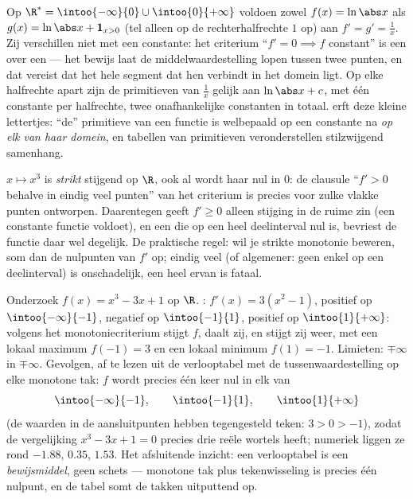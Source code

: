 \begin{example}\label{ex:b1:derivative:intervalmatters}
Op $\R^* = \intoo{-\infty}{0} \cup \intoo{0}{+\infty}$ voldoen
zowel $f(x) = \ln\abs x$ als $g(x) = \ln\abs x + \mathbf{1}_{x>0}$
(tel alleen op de rechterhalfrechte $1$ op) aan $f' = g' =
\frac1x$. Zij verschillen niet met een constante: het criterium
``$f' = 0 \implies f$ constant'' is een  over een
\emph{} --- het bewijs laat de middelwaardestelling lopen
tussen twee punten, en dat vereist dat het hele segment dat hen
verbindt in het domein ligt. Op elke halfrechte apart zijn de
primitieven van $\frac1x$ gelijk aan $\ln\abs x + c$, met één
constante per halfrechte, twee onafhankelijke constanten in
totaal.  erft deze kleine lettertjes:
``de'' primitieve van een functie is welbepaald op een constante
na \emph{op elk  van haar domein}, en tabellen van
primitieven veronderstellen stilzwijgend samenhang.
\end{example}

\begin{example}\label{ex:b1:derivative:strictness}
$x \mapsto x^3$ is \emph{strikt} stijgend op $\R$, ook al wordt
haar  nul in $0$: de clausule ``$f' > 0$ behalve in
eindig veel punten'' van het criterium is precies voor zulke
vlakke punten ontworpen. Daarentegen geeft $f' \geq 0$ alleen
stijging in de ruime zin (een constante functie voldoet), en een
 die op een heel deelinterval nul is, bevriest de functie
daar wel degelijk. De praktische regel: wil je strikte
monotonie beweren, som dan de nulpunten van $f'$ op; eindig veel
(of algemener: geen enkel op een deelinterval) is onschadelijk,
een heel  ervan is fataal.
\end{example}

\begin{example}\label{ex:b1:derivative:variations}
Onderzoek $f(x) = x^3 - 3x + 1$ op $\R$. : $f'(x) =
3(x^2 - 1)$, positief op $\intoo{-\infty}{-1}$, negatief op
$\intoo{-1}{1}$, positief op $\intoo{1}{+\infty}$: volgens het
monotoniecriterium stijgt $f$, daalt zij, en stijgt zij weer, met
een lokaal maximum $f(-1) = 3$ en een lokaal minimum $f(1) = -1$.
Limieten: $\mp\infty$ in $\mp\infty$. Gevolgen, af te lezen uit de
verlooptabel met de tussenwaardestelling op elke monotone tak: $f$
wordt precies één keer nul in elk van
\[
\intoo{-\infty}{-1}, \qquad \intoo{-1}{1}, \qquad
\intoo{1}{+\infty}
\]
(de waarden in de aansluitpunten hebben tegengesteld teken: $3 > 0
> -1$), zodat de vergelijking $x^3 - 3x + 1 = 0$ precies drie
reële wortels heeft; numeriek liggen ze rond $-1.88$, $0.35$,
$1.53$. Het afsluitende inzicht: een verlooptabel is een
\emph{bewijsmiddel}, geen schets --- monotone tak plus
tekenwisseling is precies één nulpunt, en de tabel somt de takken
uitputtend op.
\end{example}

